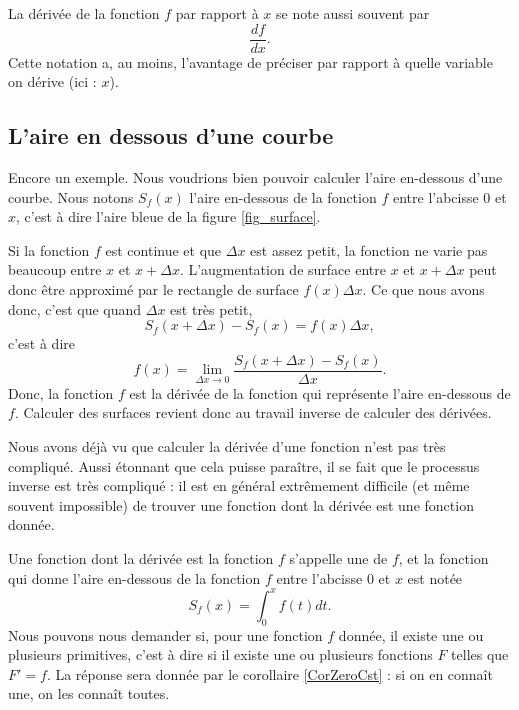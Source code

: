 La dérivée de la fonction $f$ par rapport à $x$ se note aussi souvent par
\begin{equation}
	\frac{ df }{ dx }.
\end{equation}
Cette notation a, au moins, l'avantage de préciser par rapport à quelle variable on dérive (ici : $x$).

					\subsection{L'aire en dessous d'une courbe}		\label{SubSecAirePrimInto}

Encore un exemple. Nous voudrions bien pouvoir calculer l'aire en-dessous d'une courbe. Nous notons $S_f(x)$ l'aire en-dessous de la fonction $f$ entre l'abcisse $0$ et $x$, c'est à dire l'aire bleue de la figure \ref{fig_surface}. 

Si la fonction $f$ est continue et que $\Delta x$ est assez petit, la fonction ne varie pas beaucoup entre $x$ et $x+\Delta x$. L'augmentation de surface entre $x$ et $x+\Delta x$ peut donc être approximé par le rectangle de surface $f(x)\Delta x$. Ce que nous avons donc, c'est que quand $\Delta x$ est très petit,
\begin{equation}
	S_f(x+\Delta x)-S_f(x)=f(x)\Delta x,
\end{equation}
c'est à dire
\begin{equation}
	f(x)=\lim_{\Delta x\to 0}\frac{  S_f(x+\Delta x)-S_f(x)}{ \Delta x }.
\end{equation}
Donc, la fonction $f$ est la dérivée de la fonction qui représente l'aire en-dessous de $f$. Calculer des surfaces revient donc au travail inverse de calculer des dérivées.

Nous avons déjà vu que calculer la dérivée d'une fonction n'est pas très compliqué. Aussi étonnant que cela puisse paraître, il se fait que le processus inverse est très compliqué : il est en général extrêmement difficile (et même souvent impossible) de trouver une fonction dont la dérivée est une fonction donnée.

Une fonction dont la dérivée est la fonction $f$ s'appelle une  de $f$, et la fonction qui donne l'aire en-dessous de la fonction $f$ entre l'abcisse $0$ et $x$ est notée
\begin{equation}
	S_f(x)=\int_0^xf(t)dt.
\end{equation}
Nous pouvons nous demander si, pour une fonction $f$ donnée, il existe une ou plusieurs primitives, c'est à dire si il existe une ou plusieurs fonctions $F$ telles que $F'=f$. La réponse sera donnée par le corollaire \ref{CorZeroCst} : si on en connaît une, on les connaît toutes. 

